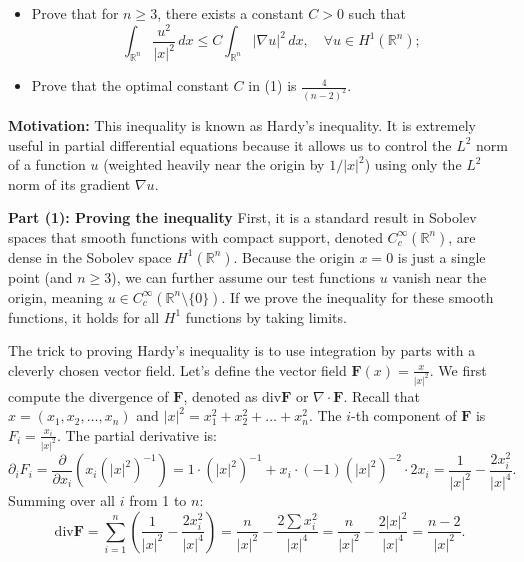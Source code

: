 \begin{exercise}
\label{analysis:2025:2}
\begin{itemize}
\item[(1)] Prove that for $n\geq 3$, there exists a constant $C>0$ such that
\[
\int_{\mathbb{R}^n}\frac{u^2}{|x|^2}\,dx \leq C\int_{\mathbb{R}^n}|\nabla u|^2\,dx, \quad \forall u\in H^1(\mathbb{R}^n);
\]
\item[(2)] Prove that the optimal constant $C$ in (1) is $\frac{4}{(n-2)^2}$.
\end{itemize}
\end{exercise}

\begin{solution}
\textbf{Motivation:} This inequality is known as Hardy's inequality. It is extremely useful in partial differential equations because it allows us to control the $L^2$ norm of a function $u$ (weighted heavily near the origin by $1/|x|^2$) using only the $L^2$ norm of its gradient $\nabla u$.

\textbf{Part (1): Proving the inequality}
First, it is a standard result in Sobolev spaces that smooth functions with compact support, denoted $C_c^\infty(\mathbb{R}^n)$, are dense in the Sobolev space $H^1(\mathbb{R}^n)$. Because the origin $x=0$ is just a single point (and $n \geq 3$), we can further assume our test functions $u$ vanish near the origin, meaning $u \in C_c^\infty(\mathbb{R}^n \setminus \{0\})$. If we prove the inequality for these smooth functions, it holds for all $H^1$ functions by taking limits.

The trick to proving Hardy's inequality is to use integration by parts with a cleverly chosen vector field. Let's define the vector field $\mathbf{F}(x) = \frac{x}{|x|^2}$.
We first compute the divergence of $\mathbf{F}$, denoted as $\text{div} \mathbf{F}$ or $\nabla \cdot \mathbf{F}$.
Recall that $x = (x_1, x_2, \dots, x_n)$ and $|x|^2 = x_1^2 + x_2^2 + \dots + x_n^2$.
The $i$-th component of $\mathbf{F}$ is $F_i = \frac{x_i}{|x|^2}$. The partial derivative is:
\[
\partial_i F_i = \frac{\partial}{\partial x_i} \left( x_i (|x|^2)^{-1} \right) = 1 \cdot (|x|^2)^{-1} + x_i \cdot (-1)(|x|^2)^{-2} \cdot 2x_i = \frac{1}{|x|^2} - \frac{2x_i^2}{|x|^4}.
\]
Summing over all $i$ from 1 to $n$:
\[
\text{div} \mathbf{F} = \sum_{i=1}^n \left( \frac{1}{|x|^2} - \frac{2x_i^2}{|x|^4} \right) = \frac{n}{|x|^2} - \frac{2 \sum x_i^2}{|x|^4} = \frac{n}{|x|^2} - \frac{2|x|^2}{|x|^4} = \frac{n-2}{|x|^2}.
\]


\end{solution}
